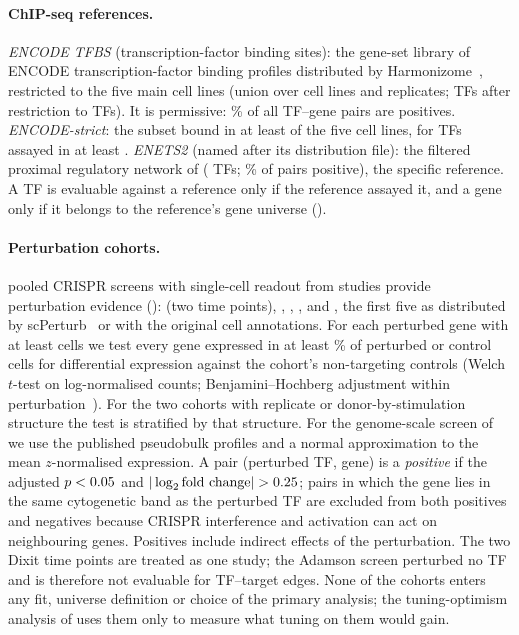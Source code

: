 \paragraph{ChIP-seq references.}
\emph{ENCODE TFBS} (transcription-factor binding sites): the gene-set library of ENCODE transcription-factor binding profiles distributed by Harmonizome~\citep{rouillard2016harmonizome,encode2012integrated}, restricted to the five main cell lines (union over cell lines and replicates; \nEncTfs{} TFs after restriction to \citet{lambert2018human} TFs). It is permissive: \nEncDensityPct{}\% of all TF--gene pairs are positives.
\emph{ENCODE-strict}: the subset bound in at least \nEncStrictMinLines{} of the five cell lines, for TFs assayed in at least \nEncStrictMinLines{}.
\emph{ENETS2} (named after its distribution file): the filtered proximal regulatory network of \citet{gerstein2012architecture} (\nEnetTfs{} TFs; \nEnetDensityPct{}\% of pairs positive), the specific reference.
A TF is evaluable against a reference only if the reference assayed it, and a gene only if it belongs to the reference's gene universe ().

\paragraph{Perturbation cohorts.}
\nCohNCap{} pooled CRISPR screens with single-cell readout from \nCohStudies{} studies provide perturbation evidence (): \citet{dixit2016perturb} (two time points), \citet{adamson2016multiplexed}, \citet{shifrut2018genome}, \citet{norman2019exploring}, \citet{papalexi2021characterizing} and \citet{replogle2022mapping}, the first five as distributed by scPerturb~\citep{peidli2024scperturb} or with the original cell annotations.
For each perturbed gene with at least \nDeMinCells{} cells we test every gene expressed in at least \nDeMinFracPct{}\% of perturbed or control cells for differential expression against the cohort's non-targeting controls (Welch $t$-test on log-normalised counts; Benjamini--Hochberg adjustment within perturbation~\citep{benjamini1995controlling}).
For the two cohorts with replicate or donor-by-stimulation structure the test is stratified by that structure.
For the genome-scale screen of \citet{replogle2022mapping} we use the published pseudobulk profiles and a normal approximation to the mean $z$-normalised expression.
A pair (perturbed TF, gene) is a \emph{positive} if the adjusted $p<0.05{}$ and $|\log_2 \text{fold change}|>\nDeMinLfc{}$; pairs in which the gene lies in the same cytogenetic band as the perturbed TF are excluded from both positives and negatives because CRISPR interference and activation can act on neighbouring genes.
Positives include indirect effects of the perturbation.
The two Dixit time points are treated as one study; the Adamson screen perturbed no TF and is therefore not evaluable for TF--target edges.
None of the cohorts enters any fit, universe definition or choice of the primary analysis; the tuning-optimism analysis of  uses them only to measure what tuning on them would gain.

